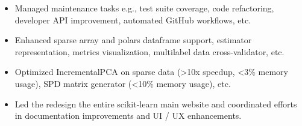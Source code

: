 


\begin{itemize}[nosep]
  \item Managed maintenance tasks e.g., test suite coverage, code refactoring, developer API improvement, automated GitHub workflows, etc.
  \item Enhanced sparse array and polars dataframe support, estimator representation, metrics visualization, multilabel data cross-validator, etc.
  \item Optimized IncrementalPCA on sparse data (>10x speedup, <3\% memory usage), SPD matrix generator (<10\% memory usage), etc.
  \item Led the redesign the entire scikit-learn main website and coordinated efforts in documentation improvements and UI / UX enhancements.
\end{itemize}
